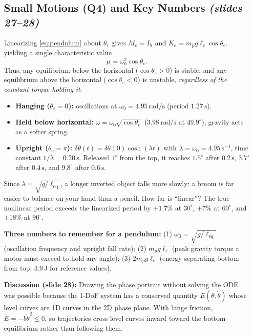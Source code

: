 \documentclass[11pt, a4paper]{article}
\theoremstyle{definition}
\theoremstyle{plain}
\begin{document}
\subsection{Small Motions (Q4) and Key Numbers \emph{(slides 27--28)}}

Linearizing \eqref{eq:pendulum} about $\theta_e$ gives $M_e = I_h$ and $K_e = m_p g \ell_c \cos\theta_e$, yielding a single characteristic value
\[
  \mu = \omega_0^2 \cos\theta_e.
\]
Thus, any equilibrium below the horizontal ($\cos\theta_e > 0$) is stable, and any equilibrium above the horizontal ($\cos\theta_e < 0$) is unstable, \emph{regardless of the constant torque holding it}:
\begin{itemize}
  \item \textbf{Hanging ($\theta_e = 0$):} oscillations at $\omega_0 = 4.95\,\mathrm{rad/s}$ (period $1.27\,\mathrm{s}$).
  \item \textbf{Held below horizontal:} $\omega = \omega_0 \sqrt{\cos\theta_e}$ ($3.98\,\mathrm{rad/s}$ at $49.9^\circ$); gravity acts as a softer spring.
  \item \textbf{Upright ($\theta_e = \pi$):} $\delta\theta(t) = \delta\theta(0)\cosh(\lambda t)$ with $\lambda = \omega_0 = 4.95\,\mathrm{s}^{-1}$, time constant $1/\lambda = 0.20\,\mathrm{s}$. Released $1^\circ$ from the top, it reaches $1.5^\circ$ after $0.2\,\mathrm{s}$, $3.7^\circ$ after $0.4\,\mathrm{s}$, and $9.8^\circ$ after $0.6\,\mathrm{s}$.
\end{itemize}

\begin{intuition}
Since $\lambda = \sqrt{g / \ell_{\text{eq}}}$, a longer inverted object falls more slowly: a broom is far easier to balance on your hand than a pencil. How far is ``linear''? The true nonlinear period exceeds the linearized period by $+1.7\%$ at $30^\circ$, $+7\%$ at $60^\circ$, and $+18\%$ at $90^\circ$.

\medskip
\noindent\textbf{Three numbers to remember for a pendulum:} (1) $\omega_0 = \sqrt{g/\ell_{\text{eq}}}$ (oscillation frequency and upright fall rate); (2) $m_p g \ell_c$ (peak gravity torque a motor must exceed to hold any angle); (3) $2 m_p g \ell_c$ (energy separating bottom from top: $3.9\,\mathrm{J}$ for reference values).

\medskip
\noindent\textbf{Discussion (slide 28):} Drawing the phase portrait without solving the ODE was possible because the 1-DoF system has a conserved quantity $E(\theta,\dot{\theta})$ whose level curves are 1D curves in the 2D phase plane. With hinge friction, $\dot{E} = -b\dot{\theta}^2 \le 0$, so trajectories cross level curves inward toward the bottom equilibrium rather than following them.
\end{intuition}
\end{document}
